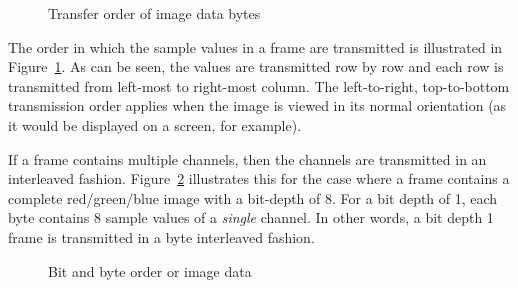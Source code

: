 \documentclass[11pt,DVIps]{report}
\begin{document}
\begin{figure}[htbp]
  \begin{center}
    \leavevmode
    \caption{Transfer order of image data bytes}
    \label{fig:xfer}
  \end{center}
\end{figure}

The order in which the sample values in a frame are transmitted is
illustrated in Figure~\ref{fig:xfer}.  As can be seen, the values are
transmitted row by row and each row is transmitted from left-most to
right-most column.  The left-to-right, top-to-bottom transmission
order applies when the image is viewed in its normal orientation (as
it would be displayed on a screen, for example).

If a frame contains multiple channels, then the channels are
transmitted in an interleaved fashion.  Figure~\ref{fig:pixels}
illustrates this for the case where a frame contains a complete
red/green/blue image with a bit-depth of 8.  For a bit depth of 1,
each byte contains 8 sample values of a {\em single\/} channel.  In
other words, a bit depth 1 frame is transmitted in a byte interleaved
fashion.

\begin{figure}[htbp]
  \begin{center}
    \leavevmode
    \caption{Bit and byte order or image data}
    \label{fig:pixels}
  \end{center}
\end{figure}
\end{document}
